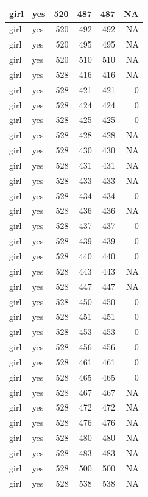 \documentclass[man]{apa6}
\begin{document}
\begin{tabular}{l|l|r|r|r|r}
\hline
girl & yes & 520 & 487 & 487 & NA\\
\hline
girl & yes & 520 & 492 & 492 & NA\\
\hline
girl & yes & 520 & 495 & 495 & NA\\
\hline
girl & yes & 520 & 510 & 510 & NA\\
\hline
girl & yes & 528 & 416 & 416 & NA\\
\hline
girl & yes & 528 & 421 & 421 & 0\\
\hline
girl & yes & 528 & 424 & 424 & 0\\
\hline
girl & yes & 528 & 425 & 425 & 0\\
\hline
girl & yes & 528 & 428 & 428 & NA\\
\hline
girl & yes & 528 & 430 & 430 & NA\\
\hline
girl & yes & 528 & 431 & 431 & NA\\
\hline
girl & yes & 528 & 433 & 433 & NA\\
\hline
girl & yes & 528 & 434 & 434 & 0\\
\hline
girl & yes & 528 & 436 & 436 & NA\\
\hline
girl & yes & 528 & 437 & 437 & 0\\
\hline
girl & yes & 528 & 439 & 439 & 0\\
\hline
girl & yes & 528 & 440 & 440 & 0\\
\hline
girl & yes & 528 & 443 & 443 & NA\\
\hline
girl & yes & 528 & 447 & 447 & NA\\
\hline
girl & yes & 528 & 450 & 450 & 0\\
\hline
girl & yes & 528 & 451 & 451 & 0\\
\hline
girl & yes & 528 & 453 & 453 & 0\\
\hline
girl & yes & 528 & 456 & 456 & 0\\
\hline
girl & yes & 528 & 461 & 461 & 0\\
\hline
girl & yes & 528 & 465 & 465 & 0\\
\hline
girl & yes & 528 & 467 & 467 & NA\\
\hline
girl & yes & 528 & 472 & 472 & NA\\
\hline
girl & yes & 528 & 476 & 476 & NA\\
\hline
girl & yes & 528 & 480 & 480 & NA\\
\hline
girl & yes & 528 & 483 & 483 & NA\\
\hline
girl & yes & 528 & 500 & 500 & NA\\
\hline
girl & yes & 528 & 538 & 538 & NA\\

\end{tabular}
\end{document}
